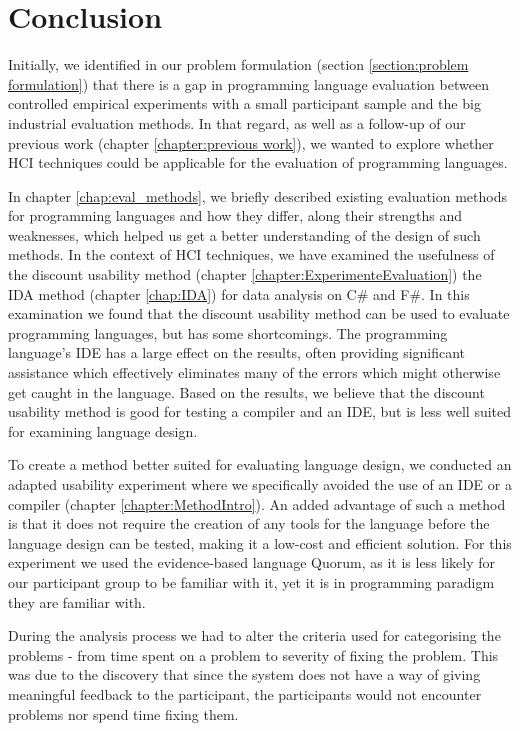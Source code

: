 \chapter{Conclusion}
\label{chap:conclusion}

Initially, we identified in our problem formulation (section \ref{section:problem formulation}) that there is a gap in programming language evaluation between controlled empirical experiments with a small participant sample and the big industrial evaluation methods. In that regard, as well as a follow-up of our previous work (chapter \ref{chapter:previous work}), we wanted to explore whether HCI techniques could be applicable for the evaluation of programming languages. 

In chapter \ref{chap:eval_methods}, we briefly described existing evaluation methods for programming languages and how they differ, along their strengths and weaknesses, which helped us get a better understanding of the design of such methods.
In the context of HCI techniques, we have examined the usefulness of the discount usability method (chapter \ref{chapter:ExperimenteEvaluation}) the IDA method (chapter \ref{chap:IDA}) for data analysis on C\# and F\#.
In this examination we found that the discount usability method can be used to evaluate programming languages, but has some shortcomings.
The programming language’s IDE has a large effect on the results, often providing significant assistance which effectively eliminates many of the errors which might otherwise get caught in the language.
Based on the results, we believe that the discount usability method is good for testing a compiler and an IDE, but is less well suited for examining language design.

To create a method better suited for evaluating language design, we conducted an adapted usability experiment where we specifically avoided the use of an IDE or a compiler (chapter \ref{chapter:MethodIntro}).
An added advantage of such a method is that it does not require the creation of any tools for the language before the language design can be tested, making it a low-cost and efficient solution. 
For this experiment we used the evidence-based language Quorum, as it is less likely for our participant group to be familiar with it, yet it is in programming paradigm they are familiar with. 

During the analysis process we had to alter the criteria used for categorising the problems - from time spent on a problem to severity of fixing the problem.
This was due to the discovery that since the system does not have a way of giving meaningful feedback to the participant, the participants would not encounter problems nor spend time fixing them.

